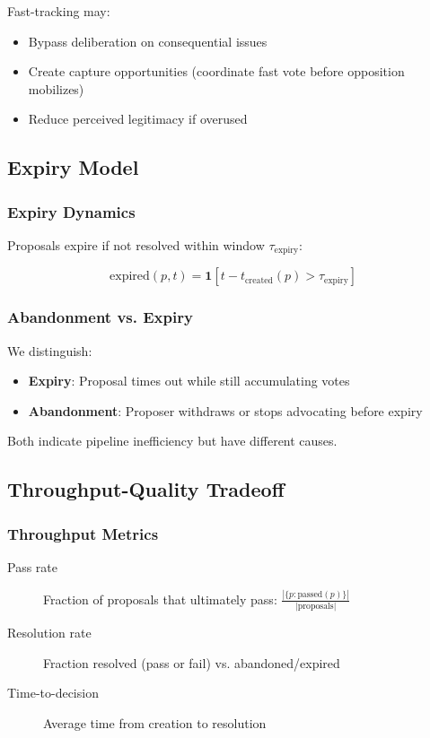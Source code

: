 Fast-tracking may:
\begin{itemize}
    \item Bypass deliberation on consequential issues
    \item Create capture opportunities (coordinate fast vote before opposition mobilizes)
    \item Reduce perceived legitimacy if overused
\end{itemize}

\subsection{Expiry Model}

\subsubsection{Expiry Dynamics}

Proposals expire if not resolved within window $\tau_{\text{expiry}}$:

\begin{equation}
\text{expired}(p, t) = \mathbf{1}\left[t - t_{\text{created}}(p) > \tau_{\text{expiry}}\right]
\end{equation}

\subsubsection{Abandonment vs. Expiry}

We distinguish:
\begin{itemize}
    \item \textbf{Expiry}: Proposal times out while still accumulating votes
    \item \textbf{Abandonment}: Proposer withdraws or stops advocating before expiry
\end{itemize}

Both indicate pipeline inefficiency but have different causes.

\subsection{Throughput-Quality Tradeoff}

\subsubsection{Throughput Metrics}

\begin{description}
    \item[Pass rate] Fraction of proposals that ultimately pass: $\frac{|\{p: \text{passed}(p)\}|}{|\text{proposals}|}$
    \item[Resolution rate] Fraction resolved (pass or fail) vs. abandoned/expired
    \item[Time-to-decision] Average time from creation to resolution
\end{description}

